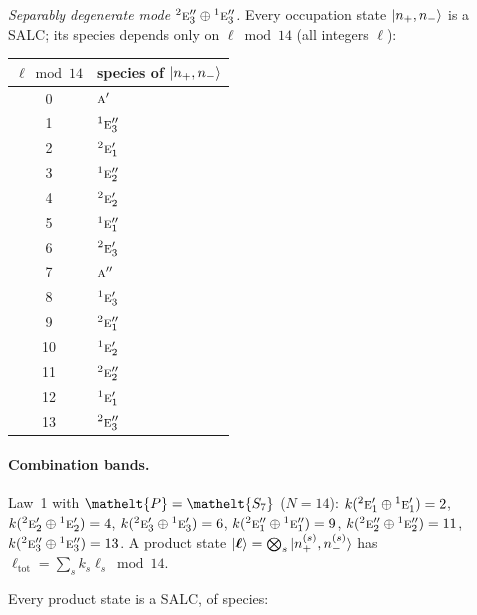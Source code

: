 \documentclass[11pt]{article}
\newcommand{\eltfont}[1]{{\let\sigma\eltsigma\mathelt{#1}}}
\newcommand{\irr}[1]{\text{\normalfont\scshape #1}}
\newcommand{\conjpair}[1]{{}^{#1}}
\newcommand{\elt}[1]{\eltfont{#1}}
\newcommand{\pel}{\elt{P}}             %
\begin{document}
\emph{Separably degenerate mode $\conjpair{2}\irr{e}_{3}''\oplus \conjpair{1}\irr{e}_{3}''$.} Every occupation state $\ket{n_+,n_-}$ is a SALC; its species depends only on $\ell\bmod 14$ (all integers $\ell$):
\begin{longtable}{c l}\hline $\ell\bmod 14$ & species of $\ket{n_+,n_-}$\\ \hline\endhead
0 & $\irr{a}'$\\
1 & $\conjpair{1}\irr{e}_{3}''$\\
2 & $\conjpair{2}\irr{e}_{1}'$\\
3 & $\conjpair{1}\irr{e}_{2}''$\\
4 & $\conjpair{2}\irr{e}_{2}'$\\
5 & $\conjpair{1}\irr{e}_{1}''$\\
6 & $\conjpair{2}\irr{e}_{3}'$\\
7 & $\irr{a}''$\\
8 & $\conjpair{1}\irr{e}_{3}'$\\
9 & $\conjpair{2}\irr{e}_{1}''$\\
10 & $\conjpair{1}\irr{e}_{2}'$\\
11 & $\conjpair{2}\irr{e}_{2}''$\\
12 & $\conjpair{1}\irr{e}_{1}'$\\
13 & $\conjpair{2}\irr{e}_{3}''$\\
\hline\end{longtable}

\paragraph{Combination bands.}

Law~1 with $\pel=\elt{S_{7}}$ ($N=14$): $k(\conjpair{2}\irr{e}_{1}'\oplus \conjpair{1}\irr{e}_{1}')=2$, $k(\conjpair{2}\irr{e}_{2}'\oplus \conjpair{1}\irr{e}_{2}')=4$, $k(\conjpair{2}\irr{e}_{3}'\oplus \conjpair{1}\irr{e}_{3}')=6$, $k(\conjpair{2}\irr{e}_{1}''\oplus \conjpair{1}\irr{e}_{1}'')=9$, $k(\conjpair{2}\irr{e}_{2}''\oplus \conjpair{1}\irr{e}_{2}'')=11$, $k(\conjpair{2}\irr{e}_{3}''\oplus \conjpair{1}\irr{e}_{3}'')=13$. A product state $\ket{\boldsymbol\ell}=\bigotimes_s\ket{n_+^{(s)},n_-^{(s)}}$ has $\ell_{\mathrm{tot}}=\sum_sk_s\ell_s\bmod 14$.

Every product state is a SALC, of species:
\end{document}
